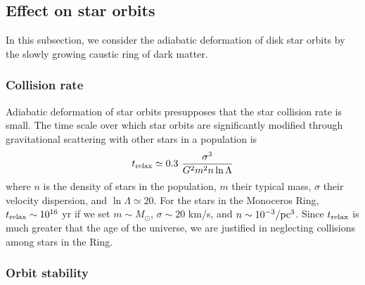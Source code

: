 \documentclass[aps,prd,preprint,tightenlines,floatfix,showpacs,groupedaddress]{revtex4}
\begin{document}
{\subsection{Effect on star orbits}

In this subsection, we consider the adiabatic deformation of 
disk star orbits by the slowly growing caustic ring of dark 
matter.  

\subsubsection{Collision rate}

Adiabatic deformation of star orbits presupposes that the star 
collision rate is small.  The time scale over which star orbits 
are significantly modified through gravitational scattering with 
other stars in a population is \cite{BT}
\begin{equation}
t_{\rm relax} \simeq 0.3~{\sigma^3 \over G^2 m^2 n \ln \Lambda}
\label{trelax}
\end{equation}
where $n$ is the density of stars in the population, $m$ 
their typical mass, $\sigma$ their velocity dispersion, and 
$\ln \Lambda \simeq 20$.  For the stars in the Monoceros Ring, 
$t_{\rm relax} \sim 10^{16}$ yr if we set $m \sim M_\odot$, 
$\sigma \sim 20$ km/s, and $n \sim 10^{-3}/{\rm pc}^3$.  Since
$t_{\rm relax}$ is much greater that the age of the universe, we
are justified in neglecting collisions among stars in the Ring.

\subsubsection{Orbit stability}

}
\end{document}
